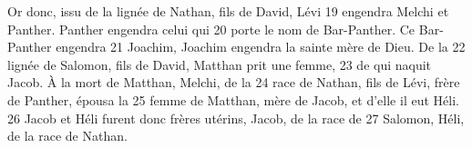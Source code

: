 Or donc, issu de la lignée de Nathan, fils de David, Lévi	 
19	 	engendra Melchi et Panther. Panther engendra celui qui	 
20	 	porte le nom de Bar-Panther. Ce Bar-Panther engendra	 
21	 	Joachim, Joachim engendra la sainte mère de Dieu. De la	 
22	 	lignée de Salomon, fils de David, Matthan prit une femme,	 
23	 	de qui naquit Jacob. À la mort de Matthan, Melchi, de la	 
24	 	race de Nathan, fils de Lévi, frère de Panther, épousa la	 
25	 	femme de Matthan, mère de Jacob, et d'elle il eut Héli.	 
26	 	Jacob et Héli furent donc frères utérins, Jacob, de la race de	 
27	 	Salomon, Héli, de la race de Nathan.